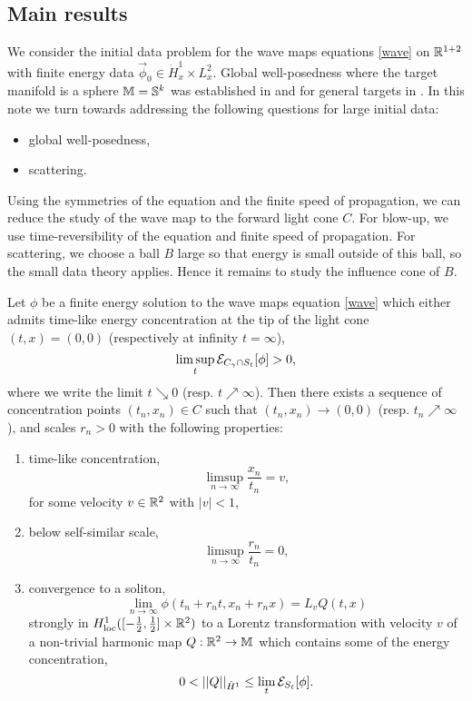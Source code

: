 \subsection{Main results}

We consider the initial data problem for the wave maps equations \eqref{wave} on $\mathbb R^{1 + 2}$ with finite energy data $\vec \phi_0 \in \dot H^1_x \times L^2_x$. Global well-posedness where the target manifold is a sphere $\mathbb M = \mathbb S^k$ was established in \cite{Tao2001} and for general targets in \cite{Tataru2005}. In this note we turn towards addressing the following questions for large initial data:
	\begin{itemize}
		\item global well-posedness, 
		\item scattering.
	\end{itemize}
Using the symmetries of the equation and the finite speed of propagation, we can reduce the study of the wave map to the forward light cone $C$. For blow-up, we use time-reversibility of the equation and finite speed of propagation. For scattering, we choose a ball $B$ large so that energy is small outside of this ball, so the small data theory applies. Hence it remains to study the influence cone of $B$. 


\begin{theorem}
	Let $\phi$ be a finite energy solution to the wave maps equation \eqref{wave} which either admits time-like energy concentration at the tip of the light cone $(t, x) = (0, 0)$ (respectively at infinity $t = \infty$), 
		\[ \limsup_{t} \mathcal E_{C_\gamma \cap S_t} [\phi] > 0,  \]
	where we write the limit $t \searrow 0$ (resp. $t \nearrow \infty$). Then there exists a sequence of concentration points $(t_n, x_n) \in C$ such that $(t_n, x_n) \to (0, 0)$ (resp. $t_n \nearrow \infty$), and scales $r_n > 0$ with the following properties:
		\begin{enumerate}
			\item time-like concentration, 
				\[ 
					\limsup_{n \to \infty} \frac{x_n}{t_n} = v,
				\]
				for some velocity $v \in \mathbb R^2$ with $|v| < 1$, 
			
			\item below self-similar scale, 
				\[ 
					\limsup_{n \to \infty} \frac{r_n}{t_n} = 0,  
				\]	
				
			\item convergence to a soliton, 
				\[
					\lim_{n \to \infty} \phi(t_n + r_n t, x_n + r_n x) = L_v Q (t, x)
				\]	
				strongly in $H^1_{\mathrm{loc}} ([-\tfrac12, \tfrac12] \times \mathbb R^2)$ to a Lorentz transformation with velocity $v$ of a non-trivial harmonic map $Q : \mathbb R^2 \to \mathbb M$ which contains some of the energy concentration, 
					\[ 0 < ||Q||_{\dot H^1} \leq \lim_{t} \mathcal E_{S_t} [\phi].   \]
		\end{enumerate}	
\end{theorem}

